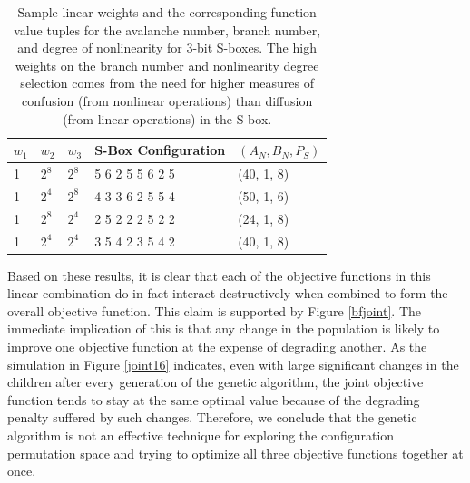 \documentclass[11pt]{article}
\begin{document}
\begin{table}
	\centering
	\caption{Sample linear weights and the corresponding function value tuples for the avalanche number, branch number, and degree of nonlinearity for $3$-bit S-boxes. The high weights on the branch number and nonlinearity degree selection comes from the need for higher measures of confusion (from nonlinear operations) than diffusion (from linear operations) in the S-box.}
	\label{jointTable}
    \begin{tabular}{|l|l|l|l|l|}
        \hline
        $w_1$ & $w_2$ & $w_3$ & S-Box Configuration & $(A_N, B_N, P_S)$ \\ \hline
        1 & $2^8$ & $2^8$ & 5     6     2     5     5     6     2     5 & (40, 1, 8) \\ 
        1 & $2^4$ & $2^8$ & 4     3     3     6     2     5     5     4 & (50, 1, 6) \\ 
        1 & $2^8$ & $2^4$ & 2     5     2     2     2     5     2     2 & (24, 1, 8) \\ 
        1 & $2^4$ & $2^4$ & 3     5     4     2     3     5     4     2 & (40, 1, 8) \\ 
        \hline
    \end{tabular}
\end{table}

Based on these results, it is clear that each of the objective functions in this linear combination do in fact interact destructively when combined to form the overall objective function. This claim is supported by Figure \ref{bfjoint}. The immediate implication of this is that any change in the population is likely to improve one objective function at the expense of degrading another. As the simulation in Figure \ref{joint16} indicates, even with large significant changes in the children after every generation of the genetic algorithm, the joint objective function tends to stay at the same optimal value because of the degrading penalty suffered by such changes. Therefore, we conclude that the genetic algorithm is not an effective technique for exploring the configuration permutation space and trying to optimize all three objective functions together at once. 
\end{document}

